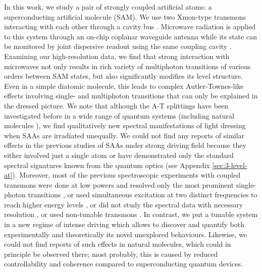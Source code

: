 \documentclass[%
 aps, prx,
 amsmath,amssymb,
 reprint,%
superscriptaddress
]{revtex4-2}
\begin{document}
In this work, we study a pair of strongly coupled 
artificial atoms: a superconducting artificial 
molecule \cite{kou2017fluxonium} (SAM). We use two 
Xmon-type \cite{barends2013coherent} 
transmons \cite{koch2007charge} interacting with 
each other through a cavity 
bus \cite{majer2007coupling}. Microwave radiation 
is applied to this system through an on-chip 
coplanar waveguide antenna while its state can be 
monitored by joint dispersive readout using the 
same coupling cavity \cite{chow2010detecting}. Examining our high-resolution data, we
find that strong interaction with microwaves not 
only results in rich variety of multiphoton transitions of 
various orders between SAM states, but also 
significantly modifies its level structure. Even 
in a simple diatomic molecule, this leads to 
complex Autler-Townes-like effects involving 
single- and multiphoton  transitions that can 
only be explained in the dressed picture. We note 
that although the A-T splittings have been 
investigated before in a wide range of quantum 
systems (including natural 
molecules \cite{tamarat1995pump, 
ahmed2012autler}), we find qualitatively new 
spectral manifestations of light dressing when 
SAAs are irradiated unequally. We could not find any reports of similar effects in the 
previous studies of SAAs under strong driving field because they
either involved just a single atom \cite{baur2009measurement, 
	sillanpaa2009autler, astafiev2010resonance, 
	novikov2013autler, 
	koshino2013observation, 
	braumuller2015multiphoton, peng2018vacuum, 
	gasparinetti2019two} or have 
demonstrated only the standard spectral 
signatures known from the quantum optics \cite{suri2013observation} (see 
Appendix \ref{sec:3-level-at}). Moreover, most of the previous spectroscopic experiments with coupled transmons were done at low powers and resolved only the most prominent single-photon transitions \cite{majer2007coupling, filipp2011multimode}, or used simultaneous excitation at two distinct frequencies to reach higher energy levels \cite{dicarlo2009demonstration}, or did not study the spectral data with necessary resolution \cite{kounalakis2018tuneable}, or used non-tunable transmons \cite{poletto2012entanglement}. In contrast, we put a tunable system in a new regime of intense driving which allows to discover and quantify both experimentally and theoretically its novel unexplored behaviours. Likewise, we could not find reports of such effects in natural molecules, 
which could in principle be observed there; most probably, this is caused by reduced controllability and 
coherence compared to superconducting quantum devices. 
\end{document}
